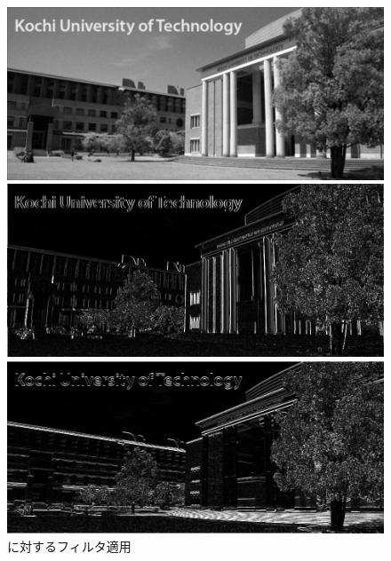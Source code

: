 \begin{figure}[h]
\begin{minipage}[b]{.49\textwidth}
\begin{minipage}[b]{.49\textwidth}
        \end{minipage}
        \begin{minipage}[b]{.49\textwidth}
            \includegraphics[keepaspectratio,width=\textwidth]{../../Figures/06_24-mf_img_in.png}
        \end{minipage}
        \caption{\inimg に対するフィルタ適用}
    \end{minipage}
    \begin{minipage}[b]{.3\textwidth}
        \centering
        \includegraphics[keepaspectratio,width=\textwidth]{../../Figures/06_31_diff-x-img.png}
    \end{minipage}
    \begin{minipage}[b]{.3\textwidth}
        \centering
        \includegraphics[keepaspectratio,width=\textwidth]{../../Figures/06_32_diff-y-img.png}

\end{minipage}
\end{figure}
